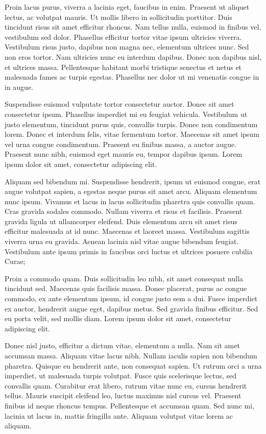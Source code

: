 \documentclass[]{article}
\begin{document}
Proin lacus purus, viverra a lacinia eget, faucibus in enim. Praesent ut
aliquet lectus, ac volutpat mauris. Ut mollis libero in sollicitudin
porttitor. Duis tincidunt risus sit amet efficitur rhoncus. Nam tellus
nulla, euismod in finibus vel, vestibulum sed dolor. Phasellus efficitur
tortor vitae ipsum ultricies viverra. Vestibulum risus justo, dapibus
non magna nec, elementum ultrices nunc. Sed non eros tortor. Nam
ultricies nunc eu interdum dapibus. Donec non dapibus nisl, et ultrices
massa. Pellentesque habitant morbi tristique senectus et netus et
malesuada fames ac turpis egestas. Phasellus nec dolor ut mi venenatis
congue in in augue.

Suspendisse euismod vulputate tortor consectetur auctor. Donec sit amet
consectetur ipsum. Phasellus imperdiet mi eu feugiat vehicula.
Vestibulum ut justo elementum, tincidunt purus quis, convallis turpis.
Donec non condimentum lorem. Donec et interdum felis, vitae fermentum
tortor. Maecenas sit amet ipsum vel urna congue condimentum. Praesent eu
finibus massa, a auctor augue. Praesent nunc nibh, euismod eget mauris
eu, tempor dapibus ipsum. Lorem ipsum dolor sit amet, consectetur
adipiscing elit.

Aliquam sed bibendum mi. Suspendisse hendrerit, ipsum ut euismod congue,
erat augue volutpat sapien, a egestas neque purus sit amet arcu. Aliquam
elementum nunc ipsum. Vivamus et lacus in lacus sollicitudin pharetra
quis convallis quam. Cras gravida sodales commodo. Nullam viverra et
risus et facilisis. Praesent gravida ligula ut ullamcorper eleifend.
Duis elementum arcu sit amet risus efficitur malesuada at id nunc.
Maecenas et laoreet massa. Vestibulum sagittis viverra urna eu gravida.
Aenean lacinia nisl vitae augue bibendum feugiat. Vestibulum ante ipsum
primis in faucibus orci luctus et ultrices posuere cubilia Curae;

Proin a commodo quam. Duis sollicitudin leo nibh, sit amet consequat
nulla tincidunt sed. Maecenas quis facilisis massa. Donec placerat,
purus ac congue commodo, ex ante elementum ipsum, id congue justo sem a
dui. Fusce imperdiet ex auctor, hendrerit augue eget, dapibus metus. Sed
gravida finibus efficitur. Sed eu porta velit, sed mollis diam. Lorem
ipsum dolor sit amet, consectetur adipiscing elit.

Donec nisl justo, efficitur a dictum vitae, elementum a nulla. Nam sit
amet accumsan massa. Aliquam vitae lacus nibh. Nullam iaculis sapien non
bibendum pharetra. Quisque eu hendrerit ante, non consequat sapien. Ut
rutrum orci a urna imperdiet, ut malesuada turpis volutpat. Fusce quis
scelerisque lectus, sed convallis quam. Curabitur erat libero, rutrum
vitae nunc eu, cursus hendrerit tellus. Mauris suscipit eleifend leo,
luctus maximus nisl cursus vel. Praesent finibus id neque rhoncus
tempus. Pellentesque et accumsan quam. Sed nunc mi, lacinia ut lacus in,
mattis fringilla ante. Aliquam volutpat vitae lorem ac aliquam.
\end{document}
